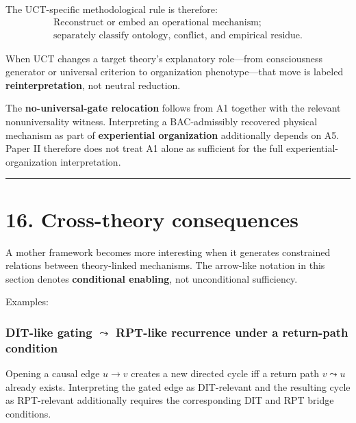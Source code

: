\documentclass[
  11pt,
  a4paper,
]{article}
\begin{document}
The UCT-specific methodological rule is therefore:
\nopagebreak[4]
\[
\boxed{\begin{gathered}
\text{Reconstruct or embed an operational mechanism;}\\
\text{separately classify ontology, conflict, and empirical residue.}
\end{gathered}}
\]

When UCT changes a target theory's explanatory role---from consciousness
generator or universal criterion to organization phenotype---that move
is labeled \textbf{reinterpretation}, not neutral reduction.

The \textbf{no-universal-gate relocation} follows from A1 together with
the relevant nonuniversality witness. Interpreting a BAC-admissibly
recovered physical mechanism as part of \textbf{experiential
organization} additionally depends on A5. Paper II therefore does not
treat A1 alone as sufficient for the full experiential-organization
interpretation.

\begin{center}\rule{0.5\linewidth}{0.5pt}\end{center}

\hypertarget{cross-theory-consequences}{%
\section{16. Cross-theory
consequences}\label{cross-theory-consequences}}

A mother framework becomes more interesting when it generates
constrained relations between theory-linked mechanisms. The arrow-like
notation in this section denotes \textbf{conditional enabling}, not
unconditional sufficiency.

Examples:

\hypertarget{dit-like-gating-leadsto-rpt-like-recurrence-under-a-return-path-condition}{%
\subsubsection{\texorpdfstring{DIT-like gating \(\leadsto\) RPT-like
recurrence under a return-path
condition}{DIT-like gating \textbackslash leadsto RPT-like recurrence under a return-path condition}}\label{dit-like-gating-leadsto-rpt-like-recurrence-under-a-return-path-condition}}

Opening a causal edge \(u\to v\) creates a new directed cycle iff a
return path \(v\leadsto u\) already exists. Interpreting the gated edge
as DIT-relevant and the resulting cycle as RPT-relevant additionally
requires the corresponding DIT and RPT bridge conditions.
\end{document}
